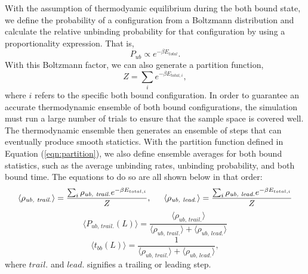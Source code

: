 With the assumption of thermodyamic equilibrium during the both bound state, we define the probability of a configuration from a Boltzmann distribution and calculate the relative unbinding probability for that configuration by using a proportionality expression. That is, 
\begin{equation}
	P_{ub}\propto e^{-\beta E_{total}}.
\end{equation}
With this Boltzmann factor, we can also generate a partition function, 
\begin{equation} \label{eqn:partition}
	Z=\sum_{i}e^{-\beta E_{total,i}},
\end{equation}
where $i$ refers to the specific both bound configuration. In order to guarantee an accurate thermodynamic ensemble of both bound configurations, the simulation must run a large number of trials to ensure that the sample space is covered well. The thermodynamic ensemble then generates an ensemble of steps that can eventually produce smooth statictics. With the partition function defined in Equation (\ref{eqn:partition}), we also define ensemble averages for both bound statistics, such as the average unbinding rates, unbinding probability, and both bound time. The equations to do so are all shown below in that order:
\begin{equation}
	\langle\rho_{\textit{ub, trail.}}\rangle=\frac{\sum_{i}\rho_{\textit{ub, trail.}} e^{-\beta E_{total,i}}}{Z}, \indent \langle\rho_{\textit{ub, lead.}}\rangle=\frac{\sum_{i}\rho_{\textit{ub, lead.}} e^{-\beta E_{total,i}}}{Z}
\end{equation}
\begin{equation} \label{eqn:ProbTrail}
	\langle P_{\textit{ub, trail.}}(L)\rangle = \frac{\langle\rho_{\textit{ub, trail.}}\rangle}{\langle\rho_{\textit{ub, trail.}}\rangle + \langle\rho_{\textit{ub, lead.}}\rangle}
\end{equation}
\begin{equation}
	\langle t_{bb}(L) \rangle =\frac{1}{\langle\rho_{\textit{ub, trail.}}\rangle + \langle\rho_{\textit{ub, lead.}}\rangle},
\end{equation}
where $trail.$ and $lead.$ signifies a trailing or leading step.





